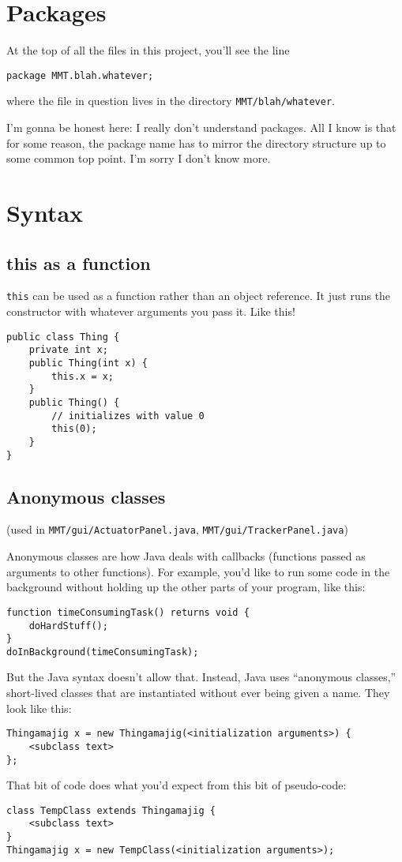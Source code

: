 \documentclass{article}
\begin{document}
\section{Packages}
At the top of all the files in this project, you'll see the line
\begin{verbatim}
package MMT.blah.whatever;
\end{verbatim}
where the file in question lives in the directory \verb!MMT/blah/whatever!.

I'm gonna be honest here: I really don't understand packages. All I know is that for some reason, the package name has to mirror the directory structure up to some common top point. I'm sorry I don't know more.

\section{Syntax}

\subsection{this as a function}
\verb!this! can be used as a function rather than an object reference. It just runs the constructor with whatever arguments you pass it. Like this!
\begin{verbatim}
public class Thing {
	private int x;
    public Thing(int x) {
        this.x = x;
    }
    public Thing() {
        // initializes with value 0
        this(0);
    }
}
\end{verbatim}
        

\subsection{Anonymous classes}
(used in \verb!MMT/gui/ActuatorPanel.java!, \verb!MMT/gui/TrackerPanel.java!)

Anonymous classes are how Java deals with callbacks (functions passed as arguments to other functions). For example, you'd like to run some code in the background without holding up the other parts of your program, like this:
\begin{verbatim}
function timeConsumingTask() returns void {
    doHardStuff();
}
doInBackground(timeConsumingTask);
\end{verbatim}

But the Java syntax doesn't allow that. Instead, Java uses ``anonymous classes,'' short-lived classes that are instantiated without ever being given a name. They look like this:
\begin{verbatim}
Thingamajig x = new Thingamajig(<initialization arguments>) {
    <subclass text>
};
\end{verbatim}
That bit of code does what you'd expect from this bit of pseudo-code:
\begin{verbatim}
class TempClass extends Thingamajig {
    <subclass text>
}
Thingamajig x = new TempClass(<initialization arguments>);
\end{verbatim}
\end{document}
